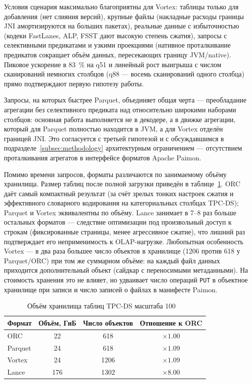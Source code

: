 Условия сценария максимально благоприятны для Vortex: таблицы
только для добавления (нет слияния версий), крупные файлы (накладные расходы границы
JNI амортизируются на больших пакетах), реальные данные с избыточностью (кодеки
FastLanes, ALP, FSST дают высокую степень сжатия), запросы с селективными
предикатами и узкими проекциями (нативное проталкивание предикатов сокращает объём
данных, пересекающих границу JVM/native). Пиковое ускорение в \SI{83}{\percent} на
q51 и линейный рост выигрыша с числом сканирований немногих столбцов (q88 --- восемь
сканирований одного столбца) прямо подтверждают первую гипотезу работы.

Запросы, на которых быстрее Parquet, объединяет общая черта --- преобладание
агрегации без селективного предиката над относительно широкими наборами столбцов:
основная работа выполняется не в декодере, а в движке агрегации, который для Parquet
полностью находится в JVM, а для Vortex отделён границей JNI. Это согласуется с
третьей гипотезой и с обсуждавшимся в подразделе~\ref{subsec:methodology}
архитектурным ограничением --- отсутствием проталкивания агрегатов в интерфейсе
форматов Apache Paimon.

Помимо времени запросов, форматы различаются по занимаемому объёму хранилища.
Размер таблиц после полной загрузки приведён в таблице~\ref{tab:tpcds-size}. ORC даёт самый компактный результат (за счёт зрелых
тонких настроек сжатия и эффективного словарного кодирования на категориальных
столбцах TPC-DS); Parquet и Vortex эквивалентны по объёму. Lance занимает в 7--8
раз больше остальных форматов --- следствие оптимизации под произвольный доступ к
строкам (фиксированные страницы, менее агрессивное сжатие), что лишний раз
подтверждает его неприменимость к OLAP-нагрузке. Любопытная особенность Vortex ---
в два раза большее число объектов в хранилище (1206 против 618 у Parquet/ORC) при
том же суммарном объёме: на каждый файл данных приходится дополнительный объект
(сайдкар с переносимыми метаданными). На стоимость хранения это не влияет, но
удваивает число операций \texttt{PUT} в объектное хранилище при записи и число
записей о файлах в манифесте Paimon.

\begin{table}
    \caption{Объём хранилища таблиц TPC-DS масштаба \SI{100}{\giga\byte}}
    \label{tab:tpcds-size}
    \begin{tabularx}{\textwidth}{|X|c|c|c|}\hline
    \textbf{Формат} & \textbf{Объём, ГиБ} & \textbf{Число объектов} & \textbf{Отношение к ORC} \\ \hline
    ORC     & 22  & 618  & ${\times}1.00$ \\ \hline
    Parquet & 24  & 618  & ${\times}1.09$ \\ \hline
    Vortex  & 24  & 1206 & ${\times}1.09$ \\ \hline
    Lance   & 176 & 1302 & ${\times}8.00$ \\ \hline
    \end{tabularx}
\end{table}

